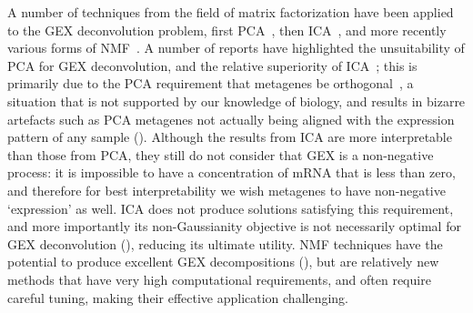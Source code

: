 \documentclass[dissertation.tex]{subfiles}
\begin{document}
A number of techniques from the field of matrix factorization have been applied to the \gls{GEX} deconvolution problem, first \gls{PCA}~\cite{Alter2000}, then \gls{ICA}~\cite{Liebermeister2002}, and more recently various forms of \gls{NMF}~\cite{Brunet2004}.  A number of reports have highlighted the unsuitability of \gls{PCA} for \gls{GEX} deconvolution, and the relative superiority of \gls{ICA}~\cite{Lee2003, Saidi2004, Teschendorff2007}; this is primarily due to the \gls{PCA} requirement that metagenes be orthogonal~\cite{Lewicki2000}, a situation that is not supported by our knowledge of biology, and results in bizarre artefacts such as \gls{PCA} metagenes not actually being aligned with the expression pattern of any sample ().  Although the results from \gls{ICA} are more interpretable than those from \gls{PCA}, they still do not consider that \gls{GEX} is a non-negative process: it is impossible to have a concentration of mRNA that is less than zero, and therefore for best interpretability we wish metagenes to have non-negative `expression' as well.  \gls{ICA} does not produce solutions satisfying this requirement, and more importantly its non-Gaussianity objective is not necessarily optimal for \gls{GEX} deconvolution (), reducing its ultimate utility.  \gls{NMF} techniques have the potential to produce excellent \gls{GEX} decompositions (), but are relatively new methods that have very high computational requirements, and often require careful tuning, making their effective application challenging.
\end{document}
